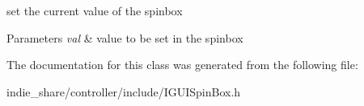 set the current value of the spinbox 


\begin{DoxyParams}{Parameters}
{\em val} & value to be set in the spinbox \\
\hline
\end{DoxyParams}


The documentation for this class was generated from the following file\+:\begin{DoxyCompactItemize}
\item 
indie\+\_\+share/controller/include/I\+G\+U\+I\+Spin\+Box.\+h\end{DoxyCompactItemize}
